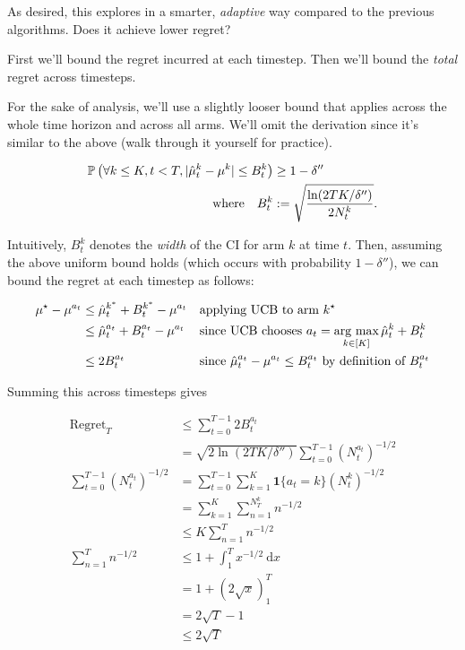 \documentclass[../main/main]{subfiles}
\begin{document}
As desired, this explores in a smarter, \emph{adaptive} way compared to the previous algorithms. Does it achieve lower regret?

First we'll bound the regret incurred at each timestep. Then we'll bound the \emph{total} regret across timesteps.

For the sake of analysis, we'll use a slightly looser bound that applies across the whole time horizon and across all arms. We'll omit the derivation since it's similar to the above (walk through it yourself for practice).

\begin{align*}
    \P\left(\forall k \le K, t < T, |\hat \mu^k_t - \mu^k | \le B^k_t \right) &\ge 1-\delta'' \\
    \text{where} \quad B^k_t &:= \sqrt{\frac{\ln(2TK/\delta'')}{2N^k_t}}.
\end{align*}

Intuitively, $B^k_t$ denotes the \emph{width} of the CI for arm $k$ at time $t$. Then, assuming the above uniform bound holds (which occurs with probability $1-\delta''$), we can bound the regret at each timestep as follows:

\begin{align*}
    \mu^\star - \mu^{a_t} &\le \hat \mu^{k^*}_t + B_t^{k^*} - \mu^{a_t} && \text{applying UCB to arm } k^\star \\
    &\le \hat \mu^{a_t}_t + B^{a_t}_t - \mu^{a_t} && \text{since UCB chooses } a_t = \argmax_{k \in [K]} \hat \mu^k_t + B_t^{k} \\
    &\le 2 B^{a_t}_t && \text{since } \hat \mu^{a_t}_t - \mu^{a_t} \le B^{a_t}_t \text{ by definition of } B^{a_t}_t \\
\end{align*}

Summing this across timesteps gives

\begin{align*}
    \text{Regret}_T &\le \sum_{t=0}^{T-1} 2 B^{a_t}_t \\
    &= \sqrt{2\ln(2TK/\delta'')} \sum_{t=0}^{T-1} (N^{a_t}_t)^{-1/2} \\
    \sum_{t=0}^{T-1} (N^{a_t}_t)^{-1/2} &= \sum_{t=0}^{T-1} \sum_{k=1}^K \mathbf{1}\{ a_t = k \} (N^k_t)^{-1/2} \\
    &= \sum_{k=1}^K \sum_{n=1}^{N_T^k} n^{-1/2} \\
    &\le K \sum_{n=1}^T n^{-1/2} \\
    \sum_{n=1}^T n^{-1/2} &\le 1 + \int_1^T x^{-1/2} \ \mathrm{d}x \\
    &= 1 + (2 \sqrt{x})_1^T \\
    &= 2 \sqrt{T} - 1 \\
    &\le 2 \sqrt{T} \\
\end{align*}
\end{document}
